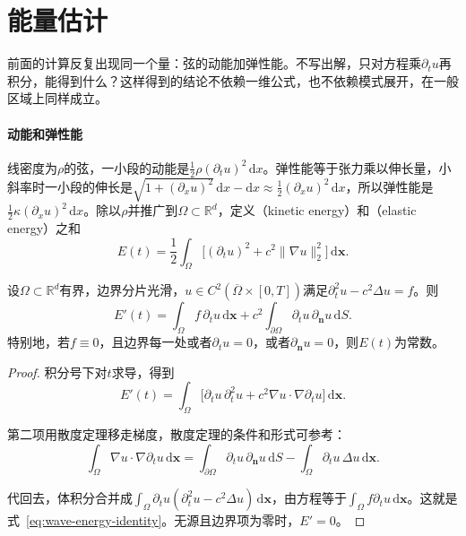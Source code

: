 \section{能量估计}
\label{sec:wave-energy}

前面的计算反复出现同一个量：弦的动能加弹性能。不写出解，只对方程乘$\partial_tu$再积分，能得到什么？这样得到的结论不依赖一维公式，也不依赖模式展开，在一般区域上同样成立。

\paragraph{动能和弹性能}
线密度为$\rho$的弦，一小段的动能是$\frac12\rho(\partial_tu)^{2}\,\mathrm{d}x$。弹性能等于张力乘以伸长量，小斜率时一小段的伸长是$\sqrt{1+(\partial_xu)^{2}}\,\mathrm{d}x-\mathrm{d}x\approx\frac12(\partial_xu)^{2}\,\mathrm{d}x$，所以弹性能是$\frac12\kappa(\partial_xu)^{2}\,\mathrm{d}x$。除以$\rho$并推广到$\Omega\subset\mathbb{R}^{d}$，定义（kinetic energy）和（elastic energy）之和
\begin{equation}
 E(t)=\frac12\int_\Omega\bigl[(\partial_tu)^{2}+c^{2}\lVert\nabla u\rVert_2^{2}\bigr]\,\mathrm{d}\bm{x}.
 \label{eq:wave-energy}
\end{equation}

\begin{theorem}[能量恒等式]
\label{thm:wave-energy-identity}
设$\Omega\subset\mathbb{R}^{d}$有界，边界分片光滑，$u\in C^{2}(\overline{\Omega}\times[0,T])$满足$\partial_t^{2}u-c^{2}\Delta u=f$。则
\begin{equation}
 E'(t)=\int_\Omega f\,\partial_tu\,\mathrm{d}\bm{x}+c^{2}\int_{\partial\Omega}\partial_tu\,\partial_{\bm{n}}u\,\mathrm{d}S .
 \label{eq:wave-energy-identity}
\end{equation}
特别地，若$f\equiv0$，且边界每一处或者$\partial_tu=0$，或者$\partial_{\bm{n}}u=0$，则$E(t)$为常数。
\end{theorem}

\begin{proof}
积分号下对$t$求导，得到
\[
 E'(t)=\int_\Omega\bigl[\partial_tu\,\partial_t^{2}u+c^{2}\nabla u\cdot\nabla\partial_tu\bigr]\,\mathrm{d}\bm{x}.
\]

第二项用散度定理移走梯度，散度定理的条件和形式可参考：
\[
 \int_\Omega\nabla u\cdot\nabla\partial_tu\,\mathrm{d}\bm{x}=\int_{\partial\Omega}\partial_tu\,\partial_{\bm{n}}u\,\mathrm{d}S-\int_\Omega\partial_tu\,\Delta u\,\mathrm{d}\bm{x}.
\]

代回去，体积分合并成$\int_\Omega\partial_tu(\partial_t^{2}u-c^{2}\Delta u)\,\mathrm{d}\bm{x}$，由方程等于$\int_\Omega f\partial_tu\,\mathrm{d}\bm{x}$。这就是式~\eqref{eq:wave-energy-identity}。无源且边界项为零时，$E'=0$。
\end{proof}

